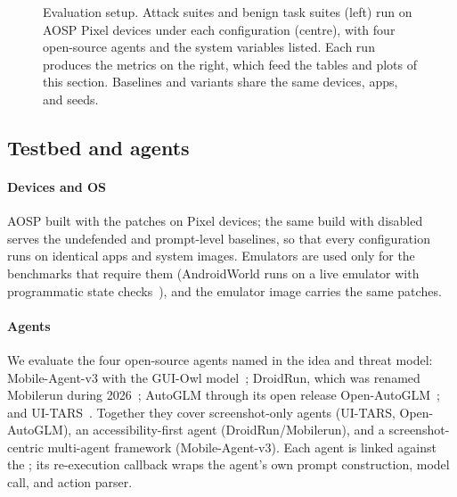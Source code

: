 \begin{figure}[t]
  \centering
  
  \caption{Evaluation setup. Attack suites and benign task suites (left) run on AOSP Pixel devices under each configuration (centre), with four open-source agents and the system variables listed. Each run produces the metrics on the right, which feed the tables and plots of this section. Baselines and \PG{} variants share the same devices, apps, and seeds.}
  \label{fig:setup}
\end{figure}

\subsection{Testbed and agents}\label{sec:testbed}

\paragraph{Devices and OS} AOSP built with the \PG{} patches on Pixel devices; the same build with \PG{} disabled serves the undefended and prompt-level baselines, so that every configuration runs on identical apps and system images.  Emulators are used only for the benchmarks that require them (AndroidWorld runs on a live emulator with programmatic state checks~\cite{rawles2025androidworld}), and the emulator image carries the same patches.

\paragraph{Agents} We evaluate the four open-source agents named in the idea and threat model: Mobile-Agent-v3 with the GUI-Owl model~\cite{ye2025mobileagentv3}; DroidRun, which was renamed Mobilerun during 2026~\cite{droidrun2025software}; AutoGLM through its open release Open-AutoGLM~\cite{liu2024autoglm,openautoglm2025software}; and UI-TARS~\cite{qin2025uitars}. Together they cover screenshot-only agents (UI-TARS, Open-AutoGLM), an accessibility-first agent (DroidRun/Mobilerun), and a screenshot-centric multi-agent framework (Mobile-Agent-v3).  Each agent is linked against the \PA{}; its re-execution callback wraps the agent's own prompt construction, model call, and action parser.

